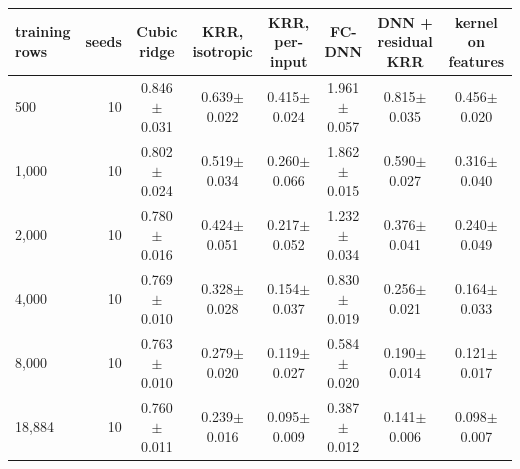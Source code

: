 \begin{tabular}{lrcccccc}
\toprule
training rows & seeds & Cubic ridge & KRR, isotropic & KRR, per-input & FC-DNN & DNN + residual KRR & kernel on features \\
\midrule
500 & 10 & 0.846$\pm$0.031 & 0.639$\pm$0.022 & 0.415$\pm$0.024 & 1.961$\pm$0.057 & 0.815$\pm$0.035 & 0.456$\pm$0.020 \\
1,000 & 10 & 0.802$\pm$0.024 & 0.519$\pm$0.034 & 0.260$\pm$0.066 & 1.862$\pm$0.015 & 0.590$\pm$0.027 & 0.316$\pm$0.040 \\
2,000 & 10 & 0.780$\pm$0.016 & 0.424$\pm$0.051 & 0.217$\pm$0.052 & 1.232$\pm$0.034 & 0.376$\pm$0.041 & 0.240$\pm$0.049 \\
4,000 & 10 & 0.769$\pm$0.010 & 0.328$\pm$0.028 & 0.154$\pm$0.037 & 0.830$\pm$0.019 & 0.256$\pm$0.021 & 0.164$\pm$0.033 \\
8,000 & 10 & 0.763$\pm$0.010 & 0.279$\pm$0.020 & 0.119$\pm$0.027 & 0.584$\pm$0.020 & 0.190$\pm$0.014 & 0.121$\pm$0.017 \\
18,884 & 10 & 0.760$\pm$0.011 & 0.239$\pm$0.016 & 0.095$\pm$0.009 & 0.387$\pm$0.012 & 0.141$\pm$0.006 & 0.098$\pm$0.007 \\
\bottomrule
\end{tabular}
